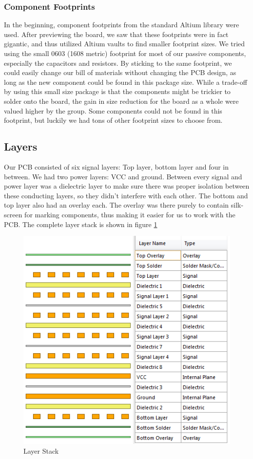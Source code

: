 \subsubsection{Component Footprints}
In the beginning, component footprints from the standard Altium library were used. After previewing the board, we saw that these footprints were in fact gigantic, and thus utilized Altium vaults to find smaller footprint sizes. We tried using the small 0603 (1608 metric) footprint for most of our passive components, especially the capacitors and resistors. By sticking to the same footprint, we could easily change our bill of materials without changing the PCB design, as long as the new component could be found in this package size. While a trade-off by using this small size package is that the components might be trickier to solder onto the board, the gain in size reduction for the board as a whole were valued higher by the group. Some components could not be found in this footprint, but luckily we had tons of other footprint sizes to choose from.


\subsection{Layers}
Our PCB consisted of six signal layers: Top layer, bottom layer and four in between. We had two power layers: VCC and ground.
\newline
Between every signal and power layer was a dielectric layer to make sure there was proper isolation between these conducting layers, so they didn't interfere with each other.
\newline
The bottom and top layer also had an overlay each. The overlay was there purely to contain silk-screen for marking components, thus making it easier for us to work with the PCB.
\newline
The complete layer stack is shown in figure \ref{fig:Layers}

\begin{figure}[h!]
\centering
\includegraphics[scale = 0.8]{images/Layers.png}
\caption{Layer Stack}
\label{fig:Layers}
\end{figure}

